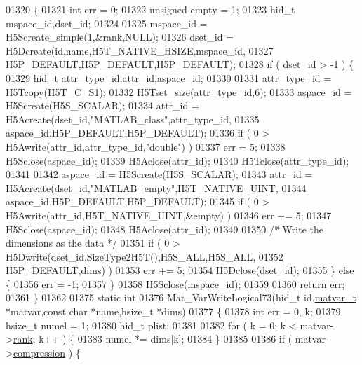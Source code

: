 \begin{DoxyCode}
{{01320 \{
01321     \textcolor{keywordtype}{int} err = 0;
01322     \textcolor{keywordtype}{unsigned} empty = 1;
01323     hid\_t mspace\_id,dset\_id;
01324 
01325     mspace\_id = H5Screate\_simple(1,&rank,NULL);
01326     dset\_id = H5Dcreate(\textcolor{keywordtype}{id},name,H5T\_NATIVE\_HSIZE,mspace\_id,
01327                         H5P\_DEFAULT,H5P\_DEFAULT,H5P\_DEFAULT);
01328     \textcolor{keywordflow}{if} ( dset\_id > -1 ) \{
01329         hid\_t attr\_type\_id,attr\_id,aspace\_id;
01330 
01331         attr\_type\_id = H5Tcopy(H5T\_C\_S1);
01332         H5Tset\_size(attr\_type\_id,6);
01333         aspace\_id = H5Screate(H5S\_SCALAR);
01334         attr\_id = H5Acreate(dset\_id,\textcolor{stringliteral}{"MATLAB\_class"},attr\_type\_id,
01335                             aspace\_id,H5P\_DEFAULT,H5P\_DEFAULT);
01336         \textcolor{keywordflow}{if} ( 0 > H5Awrite(attr\_id,attr\_type\_id,\textcolor{stringliteral}{"double"}) )
01337             err = 5;
01338         H5Sclose(aspace\_id);
01339         H5Aclose(attr\_id);
01340         H5Tclose(attr\_type\_id);
01341 
01342         aspace\_id = H5Screate(H5S\_SCALAR);
01343         attr\_id = H5Acreate(dset\_id,\textcolor{stringliteral}{"MATLAB\_empty"},H5T\_NATIVE\_UINT,
01344                             aspace\_id,H5P\_DEFAULT,H5P\_DEFAULT);
01345         \textcolor{keywordflow}{if} ( 0 > H5Awrite(attr\_id,H5T\_NATIVE\_UINT,&empty) )
01346             err += 5;
01347         H5Sclose(aspace\_id);
01348         H5Aclose(attr\_id);
01349 
01350         \textcolor{comment}{/* Write the dimensions as the data */}
01351         \textcolor{keywordflow}{if} ( 0 > H5Dwrite(dset\_id,SizeType2H5T(),H5S\_ALL,H5S\_ALL,
01352                           H5P\_DEFAULT,dims) )
01353             err += 5;
01354         H5Dclose(dset\_id);
01355     \} \textcolor{keywordflow}{else} \{
01356         err = -1;
01357     \}
01358     H5Sclose(mspace\_id);
01359 
01360     \textcolor{keywordflow}{return} err;
01361 \}
01362 
01375 \textcolor{keyword}{static} \textcolor{keywordtype}{int}
01376 Mat\_VarWriteLogical73(hid\_t \textcolor{keywordtype}{id},\hyperlink{group___m_a_t_structmatvar__t}{matvar\_t} *matvar,\textcolor{keyword}{const} \textcolor{keywordtype}{char} *name,hsize\_t *dims)
01377 \{
01378     \textcolor{keywordtype}{int}     err = 0, k;
01379     hsize\_t numel = 1;
01380     hid\_t   plist;
01381 
01382     \textcolor{keywordflow}{for} ( k = 0; k < matvar->\hyperlink{group___m_a_t_a84ba70c96ded13cc555fa75b768d9921}{rank}; k++ ) \{
01383         numel *= dims[k];
01384     \}
01385 
01386     \textcolor{keywordflow}{if} ( matvar->\hyperlink{group___m_a_t_aeef0466048621cb2c959ba7f6c774d06}{compression} ) \{
}}
\end{DoxyCode}

